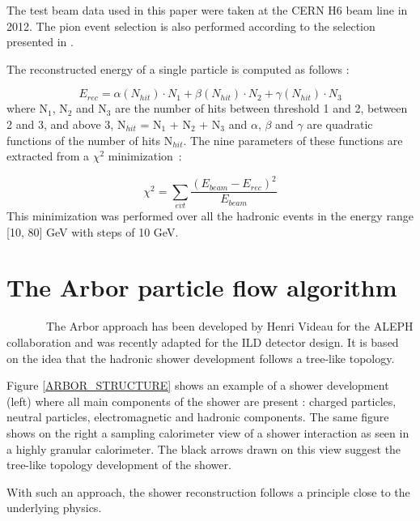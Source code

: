 \documentclass[12pt]{article}
\begin{document}
The test beam data used in this paper were taken at the CERN H6 beam line in 2012. The pion event selection is also performed according to the selection presented in \cite{sdhcal-paper}.

The reconstructed energy of a single particle is computed as follows :

\begin{equation}
  E_{rec} = \alpha(N_{hit}) \cdot N_{1}
          + \beta(N_{hit}) \cdot N_{2}
          + \gamma(N_{hit}) \cdot N_{3}   
\end{equation}
where N$_1$, N$_2$ and N$_3$ are the number of hits between threshold 1 and 2, between 2 and 3, and above 3, N$_{hit}$ = N$_1$ + N$_2$ + N$_3$ and $\alpha$, $\beta$ and $\gamma$ are quadratic functions of the number of hits N$_{hit}$. The nine parameters of these functions are extracted from a $\chi^2$ minimization~:

\begin{equation}
  \chi^2 = \sum\limits_{evt} \frac{(E_{beam} - E_{rec})^2}{E_{beam}}
\end{equation}
This minimization was performed over all the hadronic events in the energy range [10, 80] GeV with steps of 10 GeV.

\section{The Arbor particle flow algorithm}

~~~~~~~The Arbor approach has been developed by Henri Videau for the ALEPH collaboration and was recently adapted \cite{arbor-manqi} for the ILD detector design. It is based on the idea that the hadronic shower development follows a tree-like topology.

Figure \ref{ARBOR_STRUCTURE} shows an example of a shower development (left) where all main components of the shower are present : charged particles, neutral particles, electromagnetic and hadronic components.
The same figure shows on the right a sampling calorimeter view of a shower interaction as seen in a highly granular calorimeter. The black arrows drawn on this view suggest the tree-like topology development of the shower.

With such an approach, the shower reconstruction follows a principle close to the underlying physics.
\end{document}
